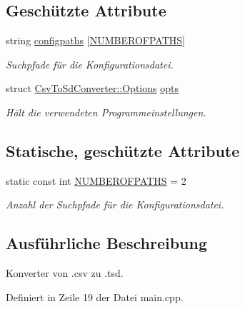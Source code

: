 \subsection*{Geschützte Attribute}
\begin{DoxyCompactItemize}
\item 
string \hyperlink{classCsvToSdConverter_a185377b44506f75748a4d56bc372ee50}{configpaths} \mbox{[}\hyperlink{classCsvToSdConverter_ad2278682506407d3172e8fca834891fe}{N\-U\-M\-B\-E\-R\-O\-F\-P\-A\-T\-H\-S}\mbox{]}
\begin{DoxyCompactList}\small\item\em Suchpfade für die Konfigurationsdatei. \end{DoxyCompactList}\item 
struct \hyperlink{structCsvToSdConverter_1_1Options}{Csv\-To\-Sd\-Converter\-::\-Options} \hyperlink{classCsvToSdConverter_aed83889861a110c9913adb5b9f4d9eb3}{opts}
\begin{DoxyCompactList}\small\item\em Hält die verwendeten Programmeinstellungen. \end{DoxyCompactList}\end{DoxyCompactItemize}
\subsection*{Statische, geschützte Attribute}
\begin{DoxyCompactItemize}
\item 
static const int \hyperlink{classCsvToSdConverter_ad2278682506407d3172e8fca834891fe}{N\-U\-M\-B\-E\-R\-O\-F\-P\-A\-T\-H\-S} = 2
\begin{DoxyCompactList}\small\item\em Anzahl der Suchpfade für die Konfigurationsdatei. \end{DoxyCompactList}\end{DoxyCompactItemize}


\subsection{Ausführliche Beschreibung}
Konverter von .csv zu .tsd. 

Definiert in Zeile 19 der Datei main.\-cpp.




